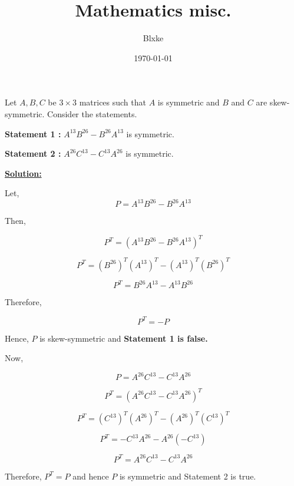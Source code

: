\documentclass[twocolumn]{article}
\title{\textbf{Mathematics misc.}}
\author{ Blxke }
\date{\today}
\newcommand\bb[1]{\textcolor{yorhafg}{\textbf{#1}}}
\begin{document}
\begin{CJK*}{UTF8}{gbsn} %

\maketitle    

\begin{question}
    \begin{small}
         Let \(A, B, C\) be \( 3\times 3 \) matrices such that \(A\) is symmetric and \( B\) and \( C\) are skew-symmetric. Consider the statements.

        \bb{Statement 1 : } \(A^{13} B^{26} - B^{26}A^{13}  \) is symmetric. 

        \bb{Statement 2 : } \(A^{26} C^{13}  - C^{13} A^{26}  \) is symmetric.     
    \end{small}
\end{question}


\vspace*{0.1in}

\bb{\underline{Solution: }} 

Let, 
\[
    P = A^{13} B^{26} - B^{26}A^{13}
\]

Then,

\[
     P^T = (A^{13} B^{26} - B^{26}A^{13})^T
\]

\[
    P^T = (B^{26})^T (A^{13})^T - (A^{13})^T (B^{26})^T    
\]

\[
    P^T = B^{26}A^{13} - A^{13} B^{26}  
\]

Therefore, 

\[
    P^T = -P 
\]

Hence, \(P\) is skew-symmetric and \textbf{Statement 1 is false.} 

Now, 

\[
    P = A^{26} C^{13}  - C^{13} A^{26}
\]

\[
    P^T = (A^{26} C^{13}  - C^{13} A^{26})^T
\]

\[
    P^T = (C^{13})^T (A^{26} )^T - (A^{26})^T (C^{13} )^T
\]

\[
    P^T = -C^{13} A^{26} - A^{26} (-C^{13} )
\]

\[
    P^T = A^{26} C^{13}  - C^{13} A^{26}
\]

Therefore, \(P^T = P\) and hence \(P\) is symmetric and Statement 2 is true. 

\vspace*{0.1in}


\end{CJK*}
\end{document}
